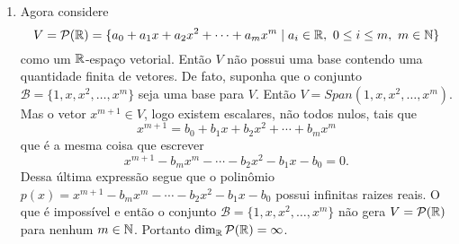 \begin{exemplos}
\begin{enumerate}
    \item Agora considere
      \[
        V = \mathcal{P}(\mathbb{R}) = \{a_0 + a_1x + a_2x^2 + \cdots + a_mx^m \mid a_i \in \mathbb{R},\ 0 \le i \le m,\ m \in \mathbb{N}\}
      \]
      como um $\mathbb{R}$-espaço vetorial. Então $V$ não possui uma base contendo uma quantidade finita de vetores. De fato, suponha que o conjunto $\mathcal{B} = \{1, x, x^2, \dots, x^m\}$ seja uma base para $V$.
      Então $V = Span(1, x, x^2, \dots, x^m)$. Mas o vetor $x^{m + 1} \in V$, logo existem escalares, não todos nulos, tais que
      \[
        x^{m + 1} = b_0 + b_1x + b_2x^2 + \cdots + b_mx^m
      \]
      que é a mesma coisa que escrever
      \[
        x^{m + 1} - b_mx^m - \cdots - b_2x^2 - b_1x - b_0 = 0.
      \]
      Dessa última expressão segue que o polinômio $p(x) = x^{m + 1} - b_mx^m - \cdots - b_2x^2 - b_1x - b_0$ possui infinitas raizes reais. O que é impossível e então o 
      conjunto $\mathcal{B} = \{1, x, x^2, \dots, x^m\}$ não gera $V = \mathcal{P}(\mathbb{R})$ para nenhum $m \in \mathbb{N}$. Portanto $\dim_{\mathbb{R}}\mathcal{P}(\mathbb{R}) = \infty$.
  \end{enumerate}
\end{exemplos}

